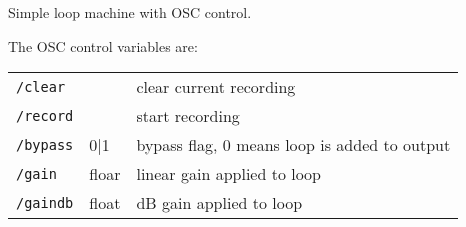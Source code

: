Simple loop machine with OSC control.



The OSC control variables are:
\begin{tabular}{lll}
{\tt /clear}  &       & clear current recording                      \\
{\tt /record} &       & start recording                              \\
{\tt /bypass} & 0|1   & bypass flag, 0 means loop is added to output \\
{\tt /gain}   & floar & linear gain applied to loop                  \\
{\tt /gaindb} & float & dB gain applied to loop                      \\
\end{tabular}


